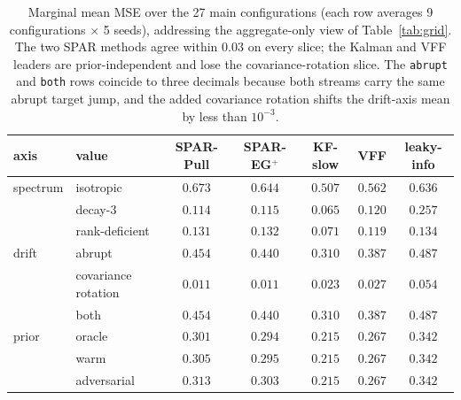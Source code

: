 \documentclass[11pt]{article}
\begin{document}
\begin{table}[htbp]
\centering
\scriptsize
\setlength{\tabcolsep}{3pt}
\caption{Marginal mean MSE over the 27 main configurations (each row averages 9 configurations $\times$ 5 seeds), addressing the aggregate-only view of Table~\ref{tab:grid}. The two SPAR methods agree within $0.03$ on every slice; the Kalman and VFF leaders are prior-independent and lose the covariance-rotation slice. The \texttt{abrupt} and \texttt{both} rows coincide to three decimals because both streams carry the same abrupt target jump, and the added covariance rotation shifts the drift-axis mean by less than $10^{-3}$.}
\label{tab:marginal}
\begin{tabular}{llccccc}
\toprule
axis & value & SPAR-Pull & SPAR-EG$^+$ & KF-slow & VFF & leaky-info \\
\midrule
spectrum & isotropic & $0.673$ & $0.644$ & $0.507$ & $0.562$ & $0.636$ \\
 & decay-3 & $0.114$ & $0.115$ & $0.065$ & $0.120$ & $0.257$ \\
 & rank-deficient & $0.131$ & $0.132$ & $0.071$ & $0.119$ & $0.134$ \\
\midrule
drift & abrupt & $0.454$ & $0.440$ & $0.310$ & $0.387$ & $0.487$ \\
 & covariance rotation & $0.011$ & $0.011$ & $0.023$ & $0.027$ & $0.054$ \\
 & both & $0.454$ & $0.440$ & $0.310$ & $0.387$ & $0.487$ \\
\midrule
prior & oracle & $0.301$ & $0.294$ & $0.215$ & $0.267$ & $0.342$ \\
 & warm & $0.305$ & $0.295$ & $0.215$ & $0.267$ & $0.342$ \\
 & adversarial & $0.313$ & $0.303$ & $0.215$ & $0.267$ & $0.342$ \\
\bottomrule
\end{tabular}
\end{table}
\end{document}
